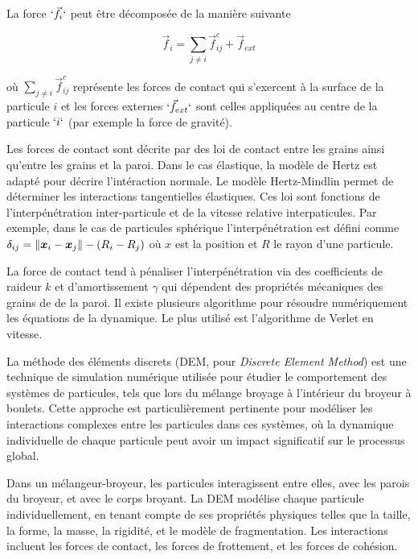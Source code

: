 La force $`\vec{f}_{i}`$ peut être décomposée de la manière suivante

\begin{equation*}
    \vec{f}_{i}=\underset{{\scriptstyle j\neq i}}{\sum}\vec{f}^{c}_{ij}+\vec{f}_{ext}
\end{equation*}

où $\underset{{\scriptstyle j\neq i}}{\sum}\vec{f}^{c}_{ij}$ représente les forces de contact qui s'exercent à la surface de la particule $i$ et les forces externes $`\vec{f}_{ext}`$ sont celles appliquées au centre de la particule $`i`$ (par exemple la force de gravité).

Les forces de contact sont décrite par des loi de contact entre les grains ainsi qu'entre les grains et la paroi. Dans le cas élastique, la modèle de Hertz est adapté pour décrire l'intéraction normale. Le modèle Hertz-Mindlin permet de déterminer les interactions tangentielles élastiques. Ces loi sont fonctions de l'interpénétration inter-particule et de la vitesse relative interpaticules. Par exemple, dans le cas de particules sphérique l'interpénétration est défini comme $\delta_{ij} = \left\lVert \bm x_i - \bm x_j \right\rVert - (R_i - R_j)$ où $x$  est la position et $R$ le rayon d'une particule.

La force de contact tend à pénaliser l'interpénétration via des coefficients de raideur $k$ et d'amortissement $\gamma$ qui dépendent des propriétés mécaniques des grains de de la paroi. Il existe plusieurs algorithme pour résoudre numériquement les équations de la dynamique. Le plus utilisé est l'algorithme de Verlet en vitesse.


La méthode des éléments discrets (DEM, pour \textit{Discrete Element Method}) est une technique de simulation numérique utilisée pour étudier le comportement des systèmes de particules, tels que lors du mélange broyage à l'intérieur du broyeur à boulets. Cette approche est particulièrement pertinente pour modéliser les interactions complexes entre les particules dans ces systèmes, où la dynamique individuelle de chaque particule peut avoir un impact significatif sur le processus global.

Dans un mélangeur-broyeur, les particules interagissent entre elles, avec les parois du broyeur, et avec le corps broyant. La DEM modélise chaque particule individuellement, en tenant compte de ses propriétés physiques telles que la taille, la forme, la masse, la rigidité, et le modèle de fragmentation. Les interactions incluent les forces de contact, les forces de frottement, et les forces de cohésion.

